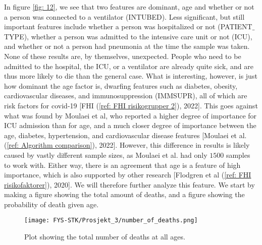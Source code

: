 \documentclass[english,notitlepage,reprint,nofootinbib]{revtex4-1}  %
\begin{document}
In figure \ref{fig: 12}, we see that two features are dominant, age and whether or not a person was connected to a ventilator (INTUBED). Less significant, but still important features include whether a person was hospitalized or not (PATIENT$\_$TYPE), whether a person was admitted to the intensive care unit or not (ICU), and whether or not a person had pneumonia at the time the sample was taken. None of these results are, by themselves, unexpected. People who need to be admitted to the hospital, the ICU, or a ventilator are already quite sick, and are thus more likely to die than the general case. What is interesting, however, is just how dominant the age factor is, dwarfing features such as diabetes, obesity, cardiovascular diseases, and immunosuppression (IMMSUPR), all of which are risk factors for covid-19 [FHI (\ref{ref: FHI risikogrupper 2}), 2022]. This goes against what was found by Moulaei et al, who reported a higher degree of importance for ICU admission than for age, and a much closer degree of importance between the age, diabetes, hypertension, and cardiovascular disease features [Moulaei et al. (\ref{ref: Algorithm comparison}), 2022]. However, this difference in results is likely caused by vastly different sample sizes, as Moulaei et al. had only $1500$ samples to work with. Either way, there is an agreement that age is a feature of high importance, which is also supported by other research [Flodgren et al (\ref{ref: FHI risikofaktorer}), 2020]. We will therefore further analyze this feature. We start by making a figure showing the total amount of deaths, and a figure showing the probability of death given age.

\begin{figure}[H]
    \centering
    \texttt{[image: FYS-STK/Prosjekt\_3/number\_of\_deaths.png]}
    \caption{Plot showing the total number of deaths at all ages.}
    \label{fig: 13}
\end{figure}
\end{document}
